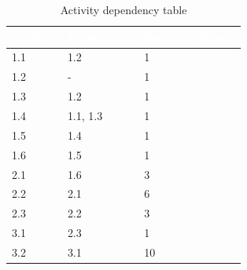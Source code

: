 \renewcommand{\arraystretch}{0.95}
\begin{table}[H]
\centering
\caption{Activity dependency table}
\begin{tabular}{|p{4cm}|p{5.83cm}|p{4cm}|} 
\hline
\rowcolor[rgb]{0.122,0.22,0.392} \textbf{\textcolor{white}{Activity}} & \textbf{\textcolor{white}{Predecessor}} & \textbf{\textcolor{white}{Duration (Days)}}  \\ 
\hline
{\cellcolor[rgb]{0.851,0.886,0.953}}1.1                               & 1.2                                     & 1                                            \\ 
\hline
{\cellcolor[rgb]{0.851,0.886,0.953}}1.2                               & -                                       & 1                                            \\ 
\hline
{\cellcolor[rgb]{0.851,0.886,0.953}}1.3                               & 1.2                                     & 1                                            \\ 
\hline
{\cellcolor[rgb]{0.851,0.886,0.953}}1.4                               & 1.1, 1.3                                & 1                                            \\ 
\hline
{\cellcolor[rgb]{0.851,0.886,0.953}}1.5                               & 1.4                                     & 1                                            \\ 
\hline
{\cellcolor[rgb]{0.851,0.886,0.953}}1.6                               & 1.5                                     & 1                                            \\ 
\hline
{\cellcolor[rgb]{0.851,0.886,0.953}}2.1                               & 1.6                                     & 3                                            \\ 
\hline
{\cellcolor[rgb]{0.851,0.886,0.953}}2.2                               & 2.1                                     & 6                                            \\ 
\hline
{\cellcolor[rgb]{0.851,0.886,0.953}}2.3                               & 2.2                                     & 3                                            \\ 
\hline
{\cellcolor[rgb]{0.851,0.886,0.953}}3.1                               & 2.3                                     & 1                                            \\ 
\hline
{\cellcolor[rgb]{0.851,0.886,0.953}}3.2                               & 3.1                                     & 10                                           \\ 

\end{tabular}
\end{table}

